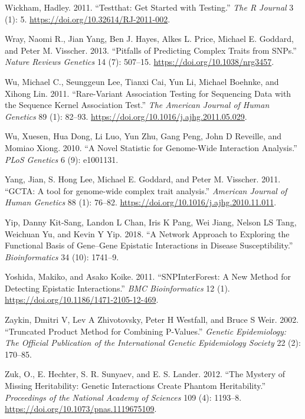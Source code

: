 \documentclass[
  11pt,
]{env/yjiao}
\newlength{\cslhangindent}
\newenvironment{cslreferences}%
  {\setlength{\parindent}{0pt}%
  \everypar{\setlength{\hangindent}{\cslhangindent}}\ignorespaces}%
  {\par}
\begin{document}
\begin{cslreferences}
\leavevmode\hypertarget{ref-wickham_testthat:_2011}{}%
Wickham, Hadley. 2011. ``Testthat: Get Started with Testing.'' \emph{The R Journal} 3 (1): 5. \url{https://doi.org/10.32614/RJ-2011-002}.

\leavevmode\hypertarget{ref-wray_pitfalls_2013}{}%
Wray, Naomi R., Jian Yang, Ben J. Hayes, Alkes L. Price, Michael E. Goddard, and Peter M. Visscher. 2013. ``Pitfalls of Predicting Complex Traits from SNPs.'' \emph{Nature Reviews Genetics} 14 (7): 507--15. \url{https://doi.org/10.1038/nrg3457}.

\leavevmode\hypertarget{ref-wu_rare-variant_2011}{}%
Wu, Michael C., Seunggeun Lee, Tianxi Cai, Yun Li, Michael Boehnke, and Xihong Lin. 2011. ``Rare-Variant Association Testing for Sequencing Data with the Sequence Kernel Association Test.'' \emph{The American Journal of Human Genetics} 89 (1): 82--93. \url{https://doi.org/10.1016/j.ajhg.2011.05.029}.

\leavevmode\hypertarget{ref-wu2010novel}{}%
Wu, Xuesen, Hua Dong, Li Luo, Yun Zhu, Gang Peng, John D Reveille, and Momiao Xiong. 2010. ``A Novel Statistic for Genome-Wide Interaction Analysis.'' \emph{PLoS Genetics} 6 (9): e1001131.

\leavevmode\hypertarget{ref-Yang2011}{}%
Yang, Jian, S. Hong Lee, Michael E. Goddard, and Peter M. Visscher. 2011. ``GCTA: A tool for genome-wide complex trait analysis.'' \emph{American Journal of Human Genetics} 88 (1): 76--82. \url{https://doi.org/10.1016/j.ajhg.2010.11.011}.

\leavevmode\hypertarget{ref-yip2018network}{}%
Yip, Danny Kit-Sang, Landon L Chan, Iris K Pang, Wei Jiang, Nelson LS Tang, Weichuan Yu, and Kevin Y Yip. 2018. ``A Network Approach to Exploring the Functional Basis of Gene--Gene Epistatic Interactions in Disease Susceptibility.'' \emph{Bioinformatics} 34 (10): 1741--9.

\leavevmode\hypertarget{ref-yoshida_snpinterforest:_2011}{}%
Yoshida, Makiko, and Asako Koike. 2011. ``SNPInterForest: A New Method for Detecting Epistatic Interactions.'' \emph{BMC Bioinformatics} 12 (1). \url{https://doi.org/10.1186/1471-2105-12-469}.

\leavevmode\hypertarget{ref-zaykin2002truncated}{}%
Zaykin, Dmitri V, Lev A Zhivotovsky, Peter H Westfall, and Bruce S Weir. 2002. ``Truncated Product Method for Combining P-Values.'' \emph{Genetic Epidemiology: The Official Publication of the International Genetic Epidemiology Society} 22 (2): 170--85.

\leavevmode\hypertarget{ref-zuk_mystery_2012}{}%
Zuk, O., E. Hechter, S. R. Sunyaev, and E. S. Lander. 2012. ``The Mystery of Missing Heritability: Genetic Interactions Create Phantom Heritability.'' \emph{Proceedings of the National Academy of Sciences} 109 (4): 1193--8. \url{https://doi.org/10.1073/pnas.1119675109}.
\end{cslreferences}
\end{document}
